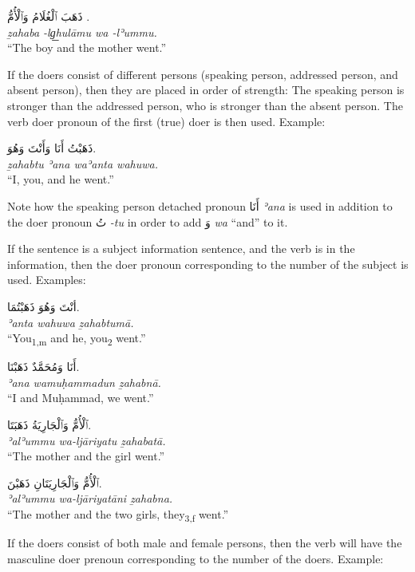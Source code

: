 \documentclass[
  10pt,
]{book}
\begin{document}
\foreignlanguage{arabic}{ذَهَبَ ٱلْغُلَامُ وَٱلْأُمُّ .}\\
\emph{ẕahaba -lg͟hulāmu wa -lʾummu.}\\
\enquote{The boy and the mother went.}

If the doers consist of different persons (speaking person, addressed person, and absent person), then they are placed in order of strength: The speaking person is stronger than the addressed person, who is stronger than the absent person. The verb doer pronoun of the first (true) doer is then used. Example:

\foreignlanguage{arabic}{ذَهَبْتُ أَنَا وَأَنْتَ وَهُوَ.}\\
\emph{ẕahabtu ʾana waʾanta wahuwa.}\\
\enquote{I, you, and he went.}

Note how the speaking person detached pronoun \foreignlanguage{arabic}{أَنَا} \emph{ʾana} is used in addition to the doer pronoun \foreignlanguage{arabic}{تُ} \emph{-tu} in order to add \foreignlanguage{arabic}{وَ} \emph{wa} \enquote{and} to it.

If the sentence is a subject information sentence, and the verb is in the information, then the doer pronoun corresponding to the number of the subject is used. Examples:

\foreignlanguage{arabic}{أنْتَ وَهُوَ ذَهَبْتُمَا.}\\
\emph{ʾanta wahuwa ẕahabtumā.}\\
\enquote{You\textsubscript{1,m} and he, you\textsubscript{2} went.}

\foreignlanguage{arabic}{أَنَا وَمُحَمَّدٌ ذَهَبْنَا.}\\
\emph{ʾana wamuḥammadun ẕahabnā.}\\
\enquote{I and Muḥammad, we went.}

\foreignlanguage{arabic}{ٱلْأُمُّ وَٱلْجَارِيَةُ ذَهَبَتَا.}\\
\emph{ʾalʾummu wa-ljāriyatu ẕahabatā.}\\
\enquote{The mother and the girl went.}

\foreignlanguage{arabic}{ٱلْأُمُّ وَٱلْجَارِيَتَانِ ذَهَبْنَ.}\\
\emph{ʾalʾummu wa-ljāriyatāni ẕahabna.}\\
\enquote{The mother and the two girls, they\textsubscript{3,f} went.}

If the doers consist of both male and female persons, then the verb will have the masculine doer prenoun corresponding to the number of the doers. Example:
\end{document}
